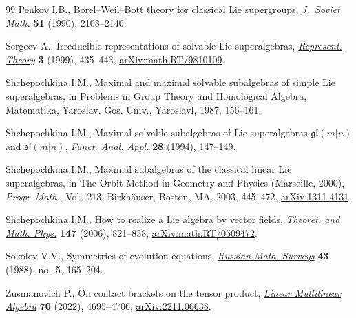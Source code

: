 \begin{thebibliography}{99}
Penkov I.B., Borel--{W}eil--{B}ott theory for classical {L}ie supergroups,
 \href{https://doi.org/10.1007/BF01098186}{\textit{J.~Soviet Math.}}
 \textbf{51} (1990), 2108--2140.

Sergeev A., Irreducible representations of solvable {L}ie superalgebras,
 \href{https://doi.org/10.1090/S1088-4165-99-00086-2}{\textit{Represent.
 Theory}} \textbf{3} (1999), 435--443,
 \href{http://arxiv.org/abs/math.RT/9810109}{arXiv:math.RT/9810109}.

Shchepochkina I.M., Maximal and maximal solvable subalgebras of simple {L}ie
 superalgebras, in Problems in Group Theory and Homological Algebra,
 Matematika, Yaroslav. Gos. Univ., Yaroslavl, 1987, 156--161.

Shchepochkina I.M., Maximal solvable subalgebras of {L}ie superalgebras
 {$\mathfrak{gl}(m|n)$} and {$\mathfrak{sl}(m|n)$},
 \href{https://doi.org/10.1007/BF01076514}{\textit{Funct. Anal. Appl.}}
 \textbf{28} (1994), 147--149.

Shchepochkina I.M., Maximal subalgebras of the classical linear {L}ie
 superalgebras, in The Orbit Method in Geometry and Physics ({M}arseille,
 2000), \textit{Progr. Math.}, Vol.~213, Birkh\"auser, Boston, MA, 2003,
 445--472, \href{http://arxiv.org/abs/1311.4131}{arXiv:1311.4131}.

Shchepochkina I.M., How to realize a {L}ie algebra by vector fields,
 \href{https://doi.org/10.1007/s11232-006-0078-5}{\textit{Theoret. and Math. Phys.}} \textbf{147} (2006), 821--838,
 \href{http://arxiv.org/abs/math.RT/0509472}{arXiv:math.RT/0509472}.

Sokolov V.V., Symmetries of evolution equations,
 \href{https://doi.org/10.1070/RM1988v043n05ABEH001927}{\textit{Russian Math.
 Surveys}} \textbf{43} (1988), no.~5, 165--204.

Zusmanovich P., On contact brackets on the tensor product,
 \href{https://doi.org/10.1080/03081087.2021.1895049}{\textit{Linear
 Multilinear Algebra}} \textbf{70} (2022), 4695--4706,
 \href{http://arxiv.org/abs/2211.06638}{arXiv:2211.06638}.

\end{thebibliography}
